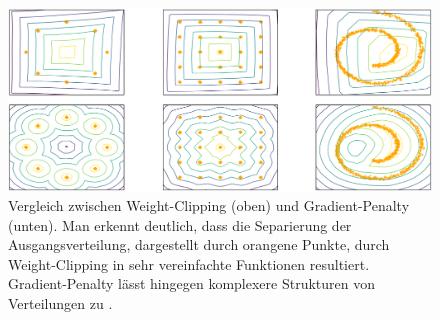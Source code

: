 \begin{figure}
\centering
\includegraphics[width=\textwidth]{images/problems_of_weight_clipping}
\caption{Vergleich zwischen Weight-Clipping (oben) und Gradient-Penalty
(unten). Man erkennt deutlich, dass die Separierung der Ausgangsverteilung,
dargestellt durch orangene Punkte, durch Weight-Clipping in sehr
vereinfachte Funktionen resultiert. Gradient-Penalty lässt hingegen
komplexere Strukturen von Verteilungen zu \cite{gulrajani2017improved}.}
\label{fig:problems-of-weight-clipping}
\end{figure}